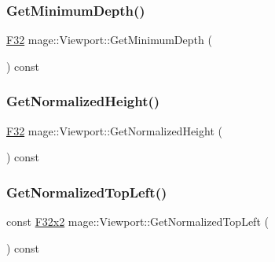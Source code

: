 \subsubsection{\texorpdfstring{Get\+Minimum\+Depth()}{GetMinimumDepth()}}
{\footnotesize\ttfamily \hyperlink{namespacemage_aa97e833b45f06d60a0a9c4fc22ae02c0}{F32} mage\+::\+Viewport\+::\+Get\+Minimum\+Depth (\begin{DoxyParamCaption}{ }\end{DoxyParamCaption}) const\hspace{0.3cm}{\ttfamily [noexcept]}}

\hypertarget{classmage_1_1_viewport_ad0319a3ff46d5939bf8a1d3f6a037e02}{}\label{classmage_1_1_viewport_ad0319a3ff46d5939bf8a1d3f6a037e02} 
\subsubsection{\texorpdfstring{Get\+Normalized\+Height()}{GetNormalizedHeight()}}
{\footnotesize\ttfamily \hyperlink{namespacemage_aa97e833b45f06d60a0a9c4fc22ae02c0}{F32} mage\+::\+Viewport\+::\+Get\+Normalized\+Height (\begin{DoxyParamCaption}{ }\end{DoxyParamCaption}) const\hspace{0.3cm}{\ttfamily [noexcept]}}

\hypertarget{classmage_1_1_viewport_a97b184ee368f96cc5343679735972adf}{}\label{classmage_1_1_viewport_a97b184ee368f96cc5343679735972adf} 
\subsubsection{\texorpdfstring{Get\+Normalized\+Top\+Left()}{GetNormalizedTopLeft()}}
{\footnotesize\ttfamily const \hyperlink{namespacemage_aa87237ad091f5cd7da612b8523fc108f}{F32x2} mage\+::\+Viewport\+::\+Get\+Normalized\+Top\+Left (\begin{DoxyParamCaption}{ }\end{DoxyParamCaption}) const\hspace{0.3cm}{\ttfamily [noexcept]}}

\hypertarget{classmage_1_1_viewport_a513fd8bd0a859e291195aaea2ed71471}{}\label{classmage_1_1_viewport_a513fd8bd0a859e291195aaea2ed71471} 
